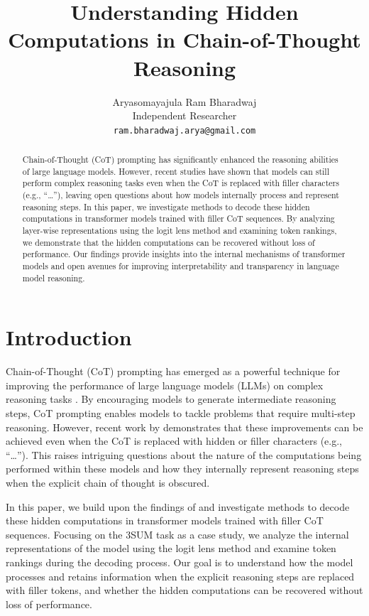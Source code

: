 \documentclass{article}
\title{Understanding Hidden Computations in Chain-of-Thought Reasoning}
\author{Aryasomayajula Ram Bharadwaj \\
Independent Researcher \\
\texttt{ram.bharadwaj.arya@gmail.com}}
\date{}
\begin{document}
\maketitle

\begin{abstract}
Chain-of-Thought (CoT) prompting has significantly enhanced the reasoning abilities of large language models. However, recent studies have shown that models can still perform complex reasoning tasks even when the CoT is replaced with filler characters (e.g., ``\ldots''), leaving open questions about how models internally process and represent reasoning steps. In this paper, we investigate methods to decode these hidden computations in transformer models trained with filler CoT sequences. By analyzing layer-wise representations using the logit lens method and examining token rankings, we demonstrate that the hidden computations can be recovered without loss of performance. Our findings provide insights into the internal mechanisms of transformer models and open avenues for improving interpretability and transparency in language model reasoning.
\end{abstract}

\section{Introduction}

Chain-of-Thought (CoT) prompting has emerged as a powerful technique for improving the performance of large language models (LLMs) on complex reasoning tasks \cite{wei2022chain}. By encouraging models to generate intermediate reasoning steps, CoT prompting enables models to tackle problems that require multi-step reasoning. However, recent work by \citet{pfau2023let} demonstrates that these improvements can be achieved even when the CoT is replaced with hidden or filler characters (e.g., ``\ldots''). This raises intriguing questions about the nature of the computations being performed within these models and how they internally represent reasoning steps when the explicit chain of thought is obscured.

In this paper, we build upon the findings of \citet{pfau2023let} and investigate methods to decode these hidden computations in transformer models trained with filler CoT sequences. Focusing on the 3SUM task as a case study, we analyze the internal representations of the model using the logit lens method \cite{nostalgebraist2020} and examine token rankings during the decoding process. Our goal is to understand how the model processes and retains information when the explicit reasoning steps are replaced with filler tokens, and whether the hidden computations can be recovered without loss of performance.
\end{document}

